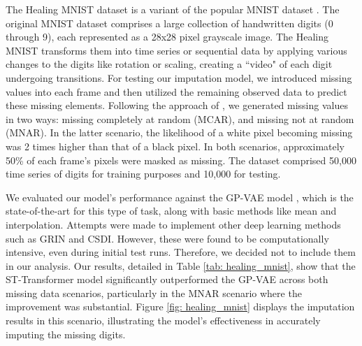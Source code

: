 \documentclass[review]{elsarticle}
\begin{document}
The Healing MNIST dataset \citep{krishnan2015deep} is a variant of the popular MNIST dataset \citep{lecun1998gradient}. The original MNIST dataset comprises a large collection of handwritten digits (0 through 9), each represented as a 28x28 pixel grayscale image. The Healing MNIST transforms them into time series or sequential data by applying various changes to the digits like rotation or scaling, creating a ``video" of each digit undergoing transitions. For testing our imputation model, we introduced missing values into each frame and then utilized the remaining observed data to predict these missing elements. Following the approach of \citet{fortuin2020gp}, we generated missing values in two ways: missing completely at random (MCAR), and missing not at random (MNAR). In the latter scenario, the likelihood of a white pixel becoming missing was 2 times higher than that of a black pixel. In both scenarios, approximately 50\% of each frame's pixels were masked as missing. The dataset comprised 50,000 time series of digits for training purposes and 10,000 for testing. 

We evaluated our model’s performance against the GP-VAE model \citep{fortuin2020gp}, which is the state-of-the-art for this type of task, along with basic methods like mean and interpolation. Attempts were made to implement other deep learning methods such as GRIN and CSDI. However, these were found to be computationally intensive, even during initial test runs. Therefore, we decided not to include them in our analysis. Our results, detailed in Table \ref{tab: healing_mnist}, show that the ST-Transformer model significantly outperformed the GP-VAE across both missing data scenarios, particularly in the MNAR scenario where the improvement was substantial. Figure \ref{fig: healing_mnist} displays the imputation results in this scenario, illustrating the model's effectiveness in accurately imputing the missing digits.
\end{document}
